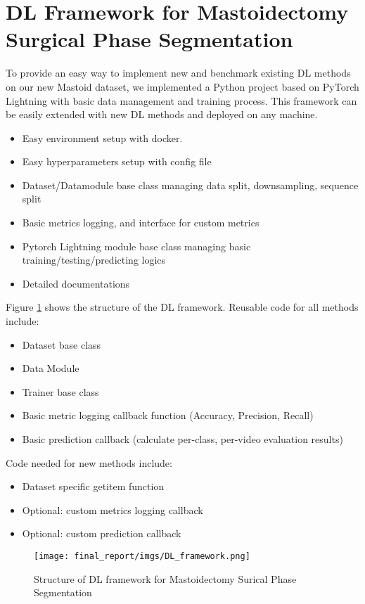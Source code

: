 \documentclass[11pt]{article} \usepackage[top=1in, bottom=1in, left=1in, right=1in]{geometry}
\begin{document}
\section{DL Framework for Mastoidectomy Surgical Phase Segmentation}
To provide an easy way to implement new and benchmark existing DL methods on our new Mastoid dataset, we implemented a Python project based on PyTorch Lightning\cite{PyTorch_Lightning} with basic data management and training process. This framework can be easily extended with new DL methods and deployed on any machine.
\begin{itemize}
    \item Easy environment setup with docker.
    \item Easy hyperparameters setup with config file
    \item Dataset/Datamodule base class managing data split, downsampling, sequence split
    \item Basic metrics logging, and interface for custom metrics
    \item Pytorch Lightning module base class managing basic training/testing/predicting logics
    \item Detailed documentations
\end{itemize}
Figure \ref{fig:DL_framework} shows the structure of the DL framework. Reusable code for all methods include:
\begin{itemize}
    \item Dataset base class
    \item Data Module
    \item Trainer base class
    \item Basic metric logging callback function (Accuracy, Precision, Recall)
    \item Basic prediction callback (calculate per-class, per-video evaluation results)
\end{itemize}
Code needed for new methods include:
\begin{itemize}
    \item Dataset specific getitem function
    \item Optional: custom metrics logging callback
    \item Optional: custom prediction callback
\end{itemize}

\begin{figure}[H]
  \texttt{[image: final\_report/imgs/DL\_framework.png]}
  \centering
  \caption{Structure of DL framework for Mastoidectomy Surical Phase Segmentation}
  \label{fig:DL_framework}
\end{figure}
\end{document}
